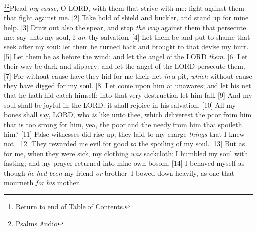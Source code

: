 \footnote{\textcolor[cmyk]{0.99998,1,0,0}{\hyperlink{TOC}{Return to end of Table of Contents.}}}\footnote{\href{https://audiobible.com/bible}{\textcolor[cmyk]{0.99998,1,0,0}{Psalms Audio}}}\textcolor[cmyk]{0.99998,1,0,0}{Plead \emph{my} \emph{cause}, O LORD, with them that strive with me: fight against them that fight against me.}\marginpar{\scriptsize \textcolor[rgb]{0.00,0.545,0.269}{$\rightarrow$(1) Strife [1], (2) Shield [2], (3) Spear [3], (4) Salvation [3], (5) Shame [4], (6) Slipping [6], (7) Spoiling [10].}}
[2] \textcolor[cmyk]{0.99998,1,0,0}{Take hold of shield and buckler, and stand up for mine help.}
[3] \textcolor[cmyk]{0.99998,1,0,0}{Draw out also the spear, and stop \emph{the} \emph{way} against them that persecute me: say unto my soul, I \emph{am} thy salvation.}
[4] \textcolor[cmyk]{0.99998,1,0,0}{Let them be  and put to shame that seek after my soul: let them be turned back and brought to  that devise my hurt.}
[5] \textcolor[cmyk]{0.99998,1,0,0}{Let them be as  before the wind: and let the angel of the LORD  \emph{them}.}
[6] \textcolor[cmyk]{0.99998,1,0,0}{Let their way be dark and slippery: and let the angel of the LORD persecute them.}
[7] \textcolor[cmyk]{0.99998,1,0,0}{For without cause have they hid for me their net \emph{in} a pit, \emph{which} without cause they have digged for my soul.}
[8] \textcolor[cmyk]{0.99998,1,0,0}{Let  come upon him at unawares; and let his net that he hath hid catch himself: into that very destruction let him fall.}
[9] \textcolor[cmyk]{0.99998,1,0,0}{And my soul shall be joyful in the LORD: it shall rejoice in his salvation.}
[10] \textcolor[cmyk]{0.99998,1,0,0}{All my bones shall say, LORD, who \emph{is} like unto thee, which deliverest the poor from him that is too strong for him, yea, the poor and the needy from him that spoileth him?}
[11] \textcolor[cmyk]{0.99998,1,0,0}{False witnesses did rise up; they laid to my charge \emph{things} that I knew not.}
[12] \textcolor[cmyk]{0.99998,1,0,0}{They rewarded me evil for good \emph{to} the spoiling of my soul.}
[13] \textcolor[cmyk]{0.99998,1,0,0}{But as for me, when they were sick, my clothing \emph{was} sackcloth: I humbled my soul with fasting; and my prayer returned into mine own bosom.}
[14] \textcolor[cmyk]{0.99998,1,0,0}{I behaved myself as though \emph{he} \emph{had} \emph{been} my friend \emph{or} brother: I bowed down heavily, as one that mourneth \emph{for} \emph{his} mother.}
